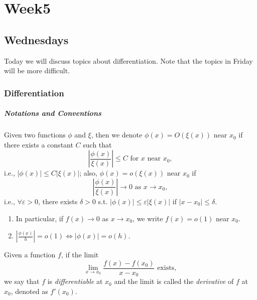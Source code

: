 
\chapter{Week5}

\section{Wednesdays}
Today we will discuss topics about differentiation. Note that the topics in Friday will be more difficult.
\subsection{Differentiation}
\paragraph{Notations and Conventions}
Given two functions $\phi$ and $\xi$, then we denote $\phi(x)=O(\xi(x))$ near $x_0$ if there exists a constant $C$ such that
\[
\left|\frac{\phi(x)}{\xi(x)}\right|\le C\mbox{ for $x$ near $x_0$},
\]
i.e., $|\phi(x)|\le C|\xi(x)|$; also, $\phi(x)=o(\xi(x))$ near $x_0$ if
\[
\left|\frac{\phi(x)}{\xi(x)}\right|\to0\mbox{ as $x\to x_0$},
\]
i.e., $\forall\varepsilon>0$, there exists $\delta>0$ s.t. $|\phi(x)|\le\varepsilon|\xi(x)|$ if $|x-x_0|\le\delta$.
\begin{remark}
\begin{enumerate}
\item
In particular, if $f(x)\to0$ as $x\to x_0$, we write $f(x)=o(1)$ near $x_0$.
\item
$|\frac{\phi(x)}{h}|=o(1)
\Longleftrightarrow
|\phi(x)|=o(h)$.
\end{enumerate}
\end{remark}

\begin{definition}[Derivative]
Given a function $f$, if the limit
\[
\lim_{x\to x_0}\frac{f(x) - f(x_0)}{x-x_0}\mbox{ exists},
\]
we say that $f$ is \emph{differentiable} at $x_0$ and the limit is called the \emph{derivative} of $f$ at $x_0$, denoted as $f'(x_0)$.
\end{definition}
